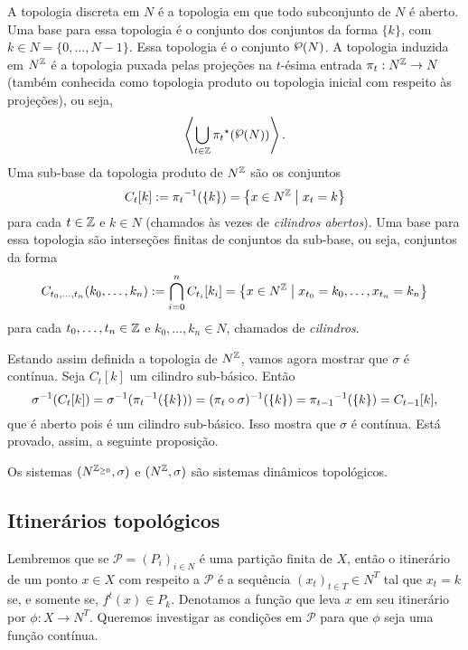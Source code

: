 A topologia discreta em $N$ é a topologia em que todo subconjunto de $N$ é aberto. Uma base para essa topologia é o conjunto dos conjuntos da forma $\{k\}$, com $k \in N=\{0,\ldots,N-1\}$. Essa topologia é o conjunto $\p(N)$. A topologia induzida em $N^{\mathbb{Z}}$ é a topologia puxada pelas projeções na $t$-ésima entrada $\pi_t: N^{\mathbb{Z}} \to N$ (também conhecida como topologia produto ou topologia inicial com respeito às projeções), ou seja,
	\begin{equation*}
	\ger{\bigcup_{t \in \Z} {\pi_t}\pux(\p(N))}.
	\end{equation*}
Uma sub-base da topologia produto de $N^{\mathbb{Z}}$ são os conjuntos
	\begin{equation*}
	C_t[k] := {\pi_t}^{-1}(\{k\}) = \left\{ x \in N^{\mathbb{Z}} \;\middle\vert\; x_t=k \right\}
	\end{equation*}
para cada $t \in \mathbb{Z}$ e $k \in N$ (chamados às vezes de \emph{cilindros abertos}). Uma base para essa topologia são interseções finitas de conjuntos da sub-base, ou seja, conjuntos da forma
	\begin{equation*}
	C_{t_0,\ldots,t_n}(k_0,\ldots,k_n) := \bigcap_{i=0}^n C_{t_i}[k_i] = \left\{ x \in N^{\mathbb{Z}} \;\middle\vert\; x_{t_0}=k_0,\ldots,x_{t_n}=k_n \right\}
	\end{equation*}
para cada $t_0,\ldots,t_n \in \mathbb{Z}$ e $k_0,\ldots,k_n \in N$, chamados de \emph{cilindros}.

Estando assim definida a topologia de $N^{\mathbb{Z}}$, vamos agora mostrar que $\sigma$ é contínua. Seja $C_t[k]$ um cilindro sub-básico. Então
	\begin{equation*}
	\sigma^{-1}(C_t[k]) = \sigma^{-1}({\pi_t}^{-1}(\{k\})) = (\pi_t \circ \sigma)^{-1}(\{k\}) = {\pi_{t-1}}^{-1}(\{k\}) = C_{t-1}[k],
	\end{equation*}
que é aberto pois é um cilindro sub-básico. Isso mostra que $\sigma$ é contínua. Está provado, assim, a seguinte proposição.

\begin{proposition}
Os sistemas $(N^{\mathbb{Z}_{\geq 0}},\sigma)$ e $(N^{\mathbb{Z}},\sigma)$ são sistemas dinâmicos topológicos.
\end{proposition}

\subsection{Itinerários topológicos}

Lembremos que se $\mathcal{P}=(P_i)_{i \in N}$ é uma partição finita de $X$, então o itinerário de um ponto $x \in X$ com respeito a $\mathcal{P}$ é a sequência $(x_t)_{t \in T} \in N^T$ tal que $x_t=k$ se, e somente se, $f^t(x) \in P_k$. Denotamos a função que leva $x$ em seu itinerário por $\phi: X \to N^T$. Queremos investigar as condições em $\mathcal{P}$ para que $\phi$ seja uma função contínua.

